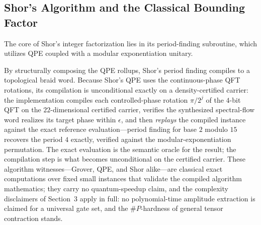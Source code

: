 \subsection{Shor's Algorithm and the Classical Bounding Factor}
\label{sec:shor}
The core of Shor's integer factorization lies in its period-finding subroutine, which utilizes QPE coupled with a modular exponentiation unitary.

By structurally composing the QPE rollups, Shor's period finding compiles to a topological braid word. Because Shor's QPE uses the continuous-phase QFT rotations, its compilation is unconditional exactly on a density-certified carrier: the implementation compiles each controlled-phase rotation $\pi/2^{j}$ of the $4$-bit QFT on the $22$-dimensional certified carrier, verifies the synthesized spectral-flow word realizes its target phase within $\epsilon$, and then \emph{replays} the compiled instance against the exact reference evaluation---period finding for base $2$ modulo $15$ recovers the period $4$ exactly, verified against the modular-exponentiation permutation. The exact evaluation is the semantic oracle for the result; the compilation step is what becomes unconditional on the certified carrier. These algorithm witnesses---Grover, QPE, and Shor alike---are classical exact computations over fixed small instances that validate the compiled algorithm mathematics; they carry no quantum-speedup claim, and the complexity disclaimers of Section~3 apply in full: no polynomial-time amplitude extraction is claimed for a universal gate set, and the $\#P$-hardness of general tensor contraction stands.
